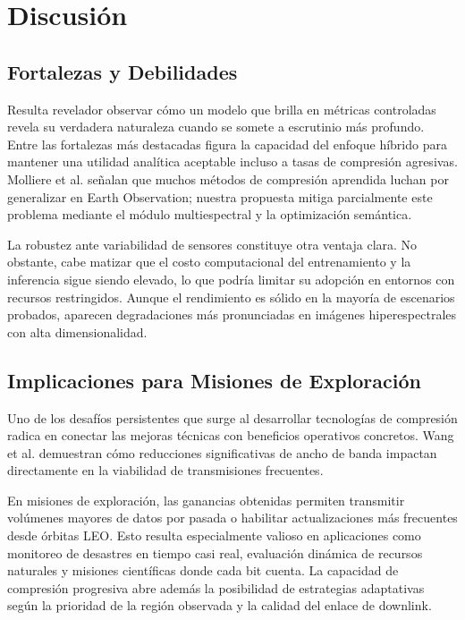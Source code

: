 \section{Discusión}

\subsection{Fortalezas y Debilidades}

Resulta revelador observar cómo un modelo que brilla en métricas controladas revela su verdadera naturaleza cuando se somete a escrutinio más profundo. Entre las fortalezas más destacadas figura la capacidad del enfoque híbrido para mantener una utilidad analítica aceptable incluso a tasas de compresión agresivas. Molliere et al. \cite{Molliere2025_Learned_EO_Compression} señalan que muchos métodos de compresión aprendida luchan por generalizar en Earth Observation; nuestra propuesta mitiga parcialmente este problema mediante el módulo multiespectral y la optimización semántica.

La robustez ante variabilidad de sensores constituye otra ventaja clara. No obstante, cabe matizar que el costo computacional del entrenamiento y la inferencia sigue siendo elevado, lo que podría limitar su adopción en entornos con recursos restringidos. Aunque el rendimiento es sólido en la mayoría de escenarios probados, aparecen degradaciones más pronunciadas en imágenes hiperespectrales con alta dimensionalidad.

\subsection{Implicaciones para Misiones de Exploración}

Uno de los desafíos persistentes que surge al desarrollar tecnologías de compresión radica en conectar las mejoras técnicas con beneficios operativos concretos. Wang et al. \cite{Wang2025_RS_Compression} demuestran cómo reducciones significativas de ancho de banda impactan directamente en la viabilidad de transmisiones frecuentes.

En misiones de exploración, las ganancias obtenidas permiten transmitir volúmenes mayores de datos por pasada o habilitar actualizaciones más frecuentes desde órbitas LEO. Esto resulta especialmente valioso en aplicaciones como monitoreo de desastres en tiempo casi real, evaluación dinámica de recursos naturales y misiones científicas donde cada bit cuenta. La capacidad de compresión progresiva abre además la posibilidad de estrategias adaptativas según la prioridad de la región observada y la calidad del enlace de downlink.

